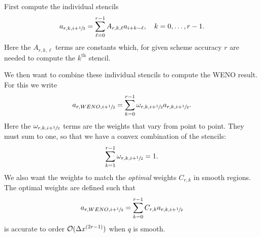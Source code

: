 First compute the individual stencils
\begin{equation}
  \label{eq:weno-stencils}
  a_{r, k, i+{\sfrac{1}{2}}} = \sum_{\ell=0}^{r-1} A_{r, k, \ell} a_{i+k-\ell}, \quad k = 0, \dots, r-1.
\end{equation}
Here the $A_{r, k, \ell}$ terms are constants which, for given scheme accuracy
$r$ are needed to compute the $k^{\text{th}}$ stencil.

We then want to combine these individual stencils to compute the WENO result.
For this we write
\begin{equation}
  \label{eq:weno-reconstruction}
  a_{r, WENO, i+{\sfrac{1}{2}}} = \sum_{k=0}^{r-1} \omega_{r, k, i+{\sfrac{1}{2}}} a_{r, k, i+{\sfrac{1}{2}}}.
\end{equation}
Here the $\omega_{r, k, i+{\sfrac{1}{2}}}$ terms are the weights that vary from point
to point. They must sum to one, so that we have a convex combination of the
stencils:
\begin{equation}
  \label{eq:weno-convex}
  \sum_{k=1}^{r-1} \omega_{r, k, i+{\sfrac{1}{2}}} = 1.
\end{equation}
We also want the weights to match the \emph{optimal} weights $C_{r, k}$ in
smooth regions. The optimal weights are defined such that
\begin{equation}
  \label{eq:weno-optimal}
  a_{r, WENO, i+{\sfrac{1}{2}}} = \sum_{k=0}^{r-1} C_{r, k} a_{r, k, i+{\sfrac{1}{2}}}
\end{equation}
is accurate to order ${\cal O}(\Delta x^{(2 r - 1)})$ when $q$ is smooth.

